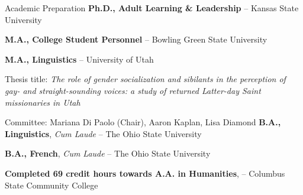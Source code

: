 \begin{rubric}{Academic Preparation}
    \entry*[2024 -- Present][\faGraduationCap]%
    \textbf{Ph.D., Adult Learning \& Leadership} -- Kansas State University
    

    \entry*[2014 -- 2016][\faGraduationCap]%
        \textbf{M.A., College Student Personnel} -- Bowling Green State University
        
    \entry*[2010 -- 2014][\faGraduationCap]%
        \textbf{M.A., Linguistics} -- University of Utah
        \par Thesis title: \emph{The role of gender socialization and sibilants in the perception of gay- and straight-sounding voices: a study of returned Latter-day Saint missionaries in Utah}
        \par Committee: Mariana Di Paolo (Chair), Aaron Kaplan, Lisa Diamond
    \entry*[2005 -- 2008][\faGraduationCap]%
        \textbf{B.A., Linguistics}, \emph{Cum Laude} -- The Ohio State University
        
    \entry*[2005 -- 2008][\faGraduationCap]%
        \textbf{B.A., French}, \emph{Cum Laude} -- The Ohio State University
        
        \entry*[2003 -- 2005][\faGraduationCap]%
        \textbf{Completed 69 credit hours towards A.A. in Humanities},  -- Columbus State Community College
        \end{rubric}